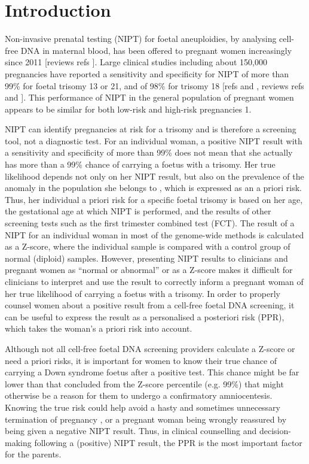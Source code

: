 \section{Introduction}\label{introduction}
Non-invasive prenatal testing (NIPT) for foetal aneuploidies, by analysing cell-free DNA in maternal blood, has been offered to pregnant women increasingly since 2011 [reviews refs \cite{Benn_2013,Norwitz_2013,Gil_2013}]. 
Large clinical studies including about 150,000 pregnancies have reported a sensitivity and specificity for NIPT of more than 99\% for foetal trisomy 13 or 21, and of 98\% for trisomy 18 [refs \cite{Zhang_2015} and \cite{Norton_2015}, reviews refs \cite{Benn_2013} and \cite{Norwitz_2013}]. 
This performance of NIPT in the general population of pregnant women \cite{Gil_2013,Zhang_2015,Norton_2015,Dan_2012,Nicolaides_2012,Fairbrother_2013,Lau_2014,Bianchi_2014} appears to be similar for both low-risk and high-risk pregnancies \cite{Zhang_2015,Norton_2015,Bianchi_2014,Dar_2014}1.

NIPT can identify pregnancies at risk for a trisomy and is therefore a screening tool, not a diagnostic test. 
For an individual woman, a positive NIPT result with a sensitivity and specificity of more than 99\% does not mean that she actually has more than a 99\% chance of carrying a foetus with a trisomy. 
Her true likelihood depends not only on her NIPT result, but also on the prevalence of the anomaly in the population she belongs to \cite{Morain_2013}, which is expressed as an a priori risk. 
Thus, her individual a priori risk for a specific foetal trisomy is based on her age, the gestational age at which NIPT is performed, and the results of other screening tests such as the first trimester combined test (FCT). 
The result of a NIPT for an individual woman in most of the genome-wide methods is calculated as a Z-score, where the individual sample is compared with a control group of normal (diploid) samples. 
However, presenting NIPT results to clinicians and pregnant women as “normal or abnormal” or as a Z-score makes it difficult for clinicians to interpret and use the result to correctly inform a pregnant woman of her true likelihood of carrying a foetus with a trisomy. 
In order to properly counsel women about a positive result from a cell-free foetal DNA screening, it can be useful to express the result as a personalised a posteriori risk (PPR), which takes the woman’s a priori risk into account.

Although not all cell-free foetal DNA screening providers calculate a Z-score or need a priori risks, it is important for women to know their true chance of carrying a Down syndrome foetus after a positive test. 
This chance might be far lower than that concluded from the Z-score percentile (e.g. 99\%) that might otherwise be a reason for them to undergo a confirmatory amniocentesis. 
Knowing the true risk could help avoid a hasty and sometimes unnecessary termination of pregnancy \cite{Willems_2014,Cheung_2015}, or a pregnant woman being wrongly reassured by being given a negative NIPT result. 
Thus, in clinical counselling and decision-making following a (positive) NIPT result, the PPR is the most important factor for the parents.

